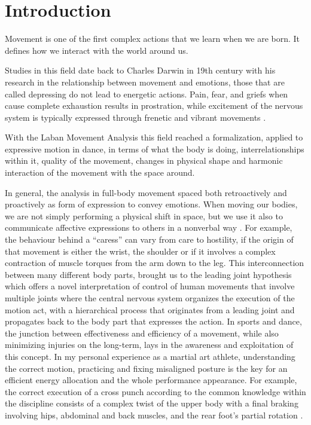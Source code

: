 \section{Introduction}
Movement is one of the first complex actions that we learn when we are born. It defines how we interact with the world around us. 

Studies in this field date back to Charles Darwin in 19th century with his research in the relationship between movement and emotions, those that are called depressing do not lead to energetic actions. Pain, fear, and griefs when cause complete exhaustion results in prostration, while excitement of the nervous system is typically expressed through frenetic and vibrant movements \cite{darwin}.  

With the Laban Movement Analysis this field reached a formalization, applied to expressive motion in dance, in terms of what the body is doing, interrelationships within it, quality of the movement, changes in physical shape and harmonic interaction of the movement with the space around. 

In general, the analysis in full-body movement spaced both retroactively and proactively as form of expression to convey emotions. 
When moving our bodies, we are not simply performing a physical shift in space, but we use it also to 
communicate affective expressions to others in a nonverbal way \cite{gelder:2009,kleinsmith:2013,karg:2013}. 
For example, the behaviour behind a “caress” can vary from care to hostility, 
if the origin of that movement is either the wrist, the shoulder or if it involves a complex 
contraction of muscle torques from the arm down to the leg. 
This interconnection between many different body parts, brought us to the leading joint hypothesis \cite{dounskaia:2010} 
which offers a novel interpretation of control of human movements that involve multiple joints 
where the central nervous system organizes the execution of the motion act, with a hierarchical process 
that originates from a leading joint and propagates back to the body part that expresses the action. 
In sports and dance, the junction between effectiveness and efficiency of a movement, while also minimizing injuries on the long-term, 
lays in the awareness and exploitation of this concept. 
In my personal experience as a martial art athlete, understanding the correct motion, practicing and fixing misaligned posture is the key for an efficient energy allocation and the whole performance appearance. For example, the correct execution of a cross punch according to the common knowledge within the discipline consists of a complex twist of the upper body with a final braking involving hips, abdominal and back muscles, and the rear foot’s partial rotation \cite{wasik:2013}. 